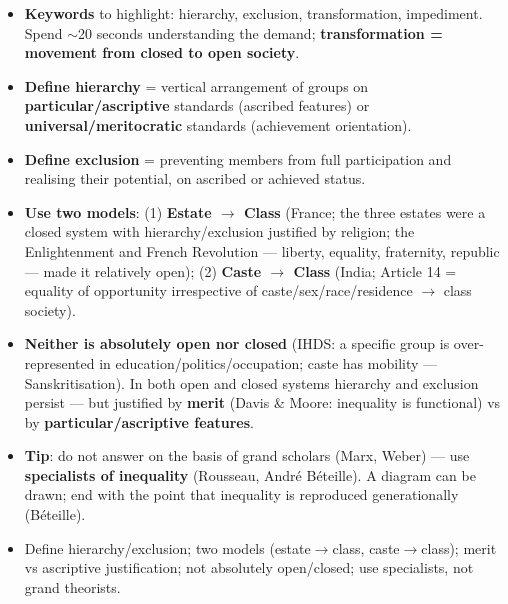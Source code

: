 \begin{PYQLink}
\begin{itemize}
    \item \textbf{Keywords} to highlight: hierarchy, exclusion, transformation, impediment. Spend $\sim$20 seconds understanding the demand; \textbf{transformation = movement from closed to open society}.
    \item \textbf{Define hierarchy} = vertical arrangement of groups on \textbf{particular/ascriptive} standards (ascribed features) or \textbf{universal/meritocratic} standards (achievement orientation).
    \item \textbf{Define exclusion} = preventing members from full participation and realising their potential, on ascribed or achieved status.
    \item \textbf{Use two models}: (1) \textbf{Estate $\rightarrow$ Class} (France; the three estates were a closed system with hierarchy/exclusion justified by religion; the Enlightenment and French Revolution --- liberty, equality, fraternity, republic --- made it relatively open); (2) \textbf{Caste $\rightarrow$ Class} (India; Article 14 = equality of opportunity irrespective of caste/sex/race/residence $\rightarrow$ class society).
    \item \textbf{Neither is absolutely open nor closed} (IHDS: a specific group is over-represented in education/politics/occupation; caste has mobility --- Sanskritisation). In both open and closed systems hierarchy and exclusion persist --- but justified by \textbf{merit} (Davis \& Moore: inequality is functional) vs by \textbf{particular/ascriptive features}.
    \item \textbf{Tip}: do not answer on the basis of grand scholars (Marx, Weber) --- use \textbf{specialists of inequality} (Rousseau, André Béteille). A diagram can be drawn; end with the point that inequality is reproduced generationally (Béteille).
\end{itemize}
\end{PYQLink}

\begin{QuickRevision}
\begin{itemize}
    \item Define hierarchy/exclusion; two models (estate$\rightarrow$class, caste$\rightarrow$class); merit vs ascriptive justification; not absolutely open/closed; use specialists, not grand theorists.
\end{itemize}
\end{QuickRevision}

